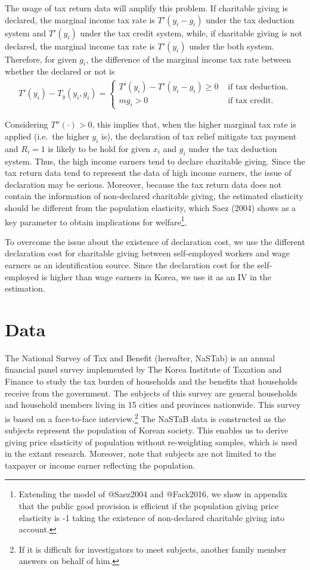 \documentclass[
  11pt,
  a4paper,
]{article}
\begin{document}
The usage of tax return data will amplify this problem. If charitable giving is declared, the marginal income tax rate is \(T'(y_i-g_i)\) under the tax deduction system and \(T'(y_i)\) under the tax credit system, while, if charitable giving is not declared, the marginal income tax rate is \(T'(y_i)\) under the both system. Therefore, for given \(g_i\), the difference of the marginal income tax rate between whether the declared or not is
\begin{align}
T'(y_i)-T_y(y_i,g_i)=\begin{cases}
    T'(y_i)-T'(y_i-g_i)\ge0 &\text{ if tax deduction}.\\
    mg_i>0 &\text{ if tax credit}.
\end{cases}
\end{align}

Considering \(T''(\cdot)>0\), this implies that, when the higher marginal tax rate is applied (i.e.~the higher \(y_i\) is), the declaration of tax relief mitigate tax payment and \(R_i=1\) is likely to be hold for given \(x_i\) and \(g_i\) under the tax deduction system. Thus, the high income earners tend to declare charitable giving. Since the tax return data tend to represent the data of high income earners, the issue of declaration may be serious. Moreover, because the tax return data does not contain the information of non-declared charitable giving, the estimated elasticity should be different from the population elasticity, which Saez (2004) shows as a key parameter to obtain implications for welfare\footnote{Extending the model of @Saez2004 and @Fack2016, we show in appendix that the public good provision is efficient if the population giving price elasticity is -1 taking the existence of non-declared charitable giving into account.}.

To overcome the issue about the existence of declaration cost, we use the different declaration cost for charitable giving between self-employed workers and wage earners as an identification source. Since the declaration cost for the self-employed is higher than wage earners in Korea, we use it as an IV in the estimation.

\hypertarget{data}{%
\section{Data}\label{data}}

The National Survey of Tax and Benefit (hereafter, NaSTab) is an annual financial panel survey
implemented by The Korea Institute of Taxation and Finance
to study the tax burden of households and the benefits that households receive from the government.
The subjects of this survey are general households and household members living in 15 cities and provinces nationwide.
This survey is based on a face-to-face interview.\footnote{If it is difficult for investigators to meet subjects, another family member answers on behalf of him.}
The NaSTaB data is constructed as the subjects represent the population of Korean society.
This enables us to derive giving price elasticity of population without re-weighting samples, which is used in the extant research.
Moreover, note that subjects are not limited to the taxpayer or income earner reflecting the population.
\end{document}

